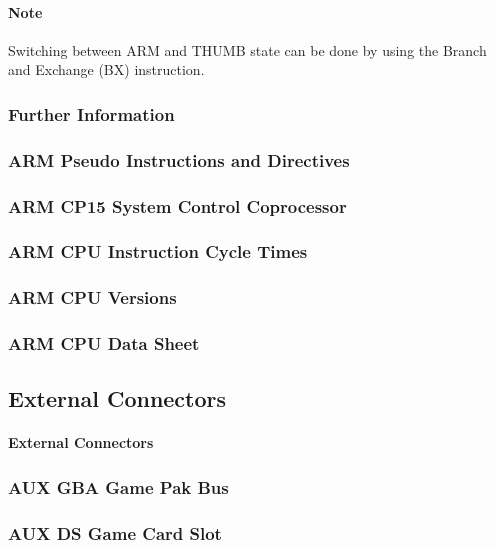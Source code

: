 \documentclass[11pt,a4paper]{proc}
\begin{document}
\begin{flushleft}
\paragraph{Note}
Switching between ARM and THUMB state can be done by using the Branch and Exchange (BX) instruction.

\subsubsection{Further Information}

\subsubsection{ARM Pseudo Instructions and Directives}

\subsubsection{ARM CP15 System Control Coprocessor}

\subsubsection{ARM CPU Instruction Cycle Times}
\subsubsection{ARM CPU Versions}
\subsubsection{ARM CPU Data Sheet}

\subsection{External Connectors}

\paragraph{External Connectors}

\subsubsection{AUX GBA Game Pak Bus}

\subsubsection{AUX DS Game Card Slot}


\end{flushleft}
\end{document}

